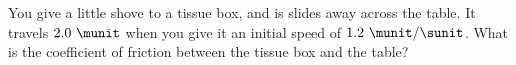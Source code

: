You give a little shove to a tissue box, and is slides away across the table.
It travels $2.0\ \munit$ when
you give it an initial speed of $1.2\ \munit / \sunit$. What is the
coefficient of friction between the tissue box and the table?\answercheck
